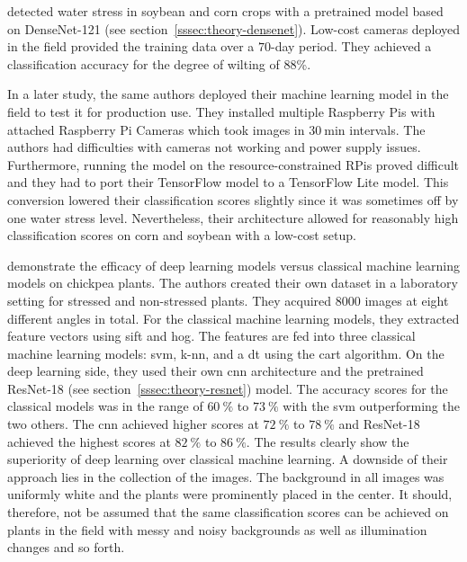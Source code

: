 \documentclass[final]{vutinfth} %
\begin{document}
\textcite{ramos-giraldo2020} detected water stress in soybean and corn
crops with a pretrained model based on DenseNet-121 (see
section~\ref{sssec:theory-densenet}). Low-cost cameras deployed in the
field provided the training data over a $70$-day period. They achieved
a classification accuracy for the degree of wilting of 88\%.

In a later study, the same authors \cite{ramos-giraldo2020a} deployed
their machine learning model in the field to test it for production
use. They installed multiple Raspberry Pis with attached Raspberry Pi
Cameras which took images in $\qty{30}{\minute}$ intervals. The
authors had difficulties with cameras not working and power supply
issues. Furthermore, running the model on the resource-constrained
RPis proved difficult and they had to port their TensorFlow model to a
TensorFlow Lite model. This conversion lowered their classification
scores slightly since it was sometimes off by one water stress
level. Nevertheless, their architecture allowed for reasonably high
classification scores on corn and soybean with a low-cost setup.

\textcite{azimi2020} demonstrate the efficacy of deep learning models
versus classical machine learning models on chickpea plants. The
authors created their own dataset in a laboratory setting for stressed
and non-stressed plants. They acquired $8000$ images at eight
different angles in total. For the classical machine learning models,
they extracted feature vectors using \gls{sift} and \gls{hog}. The
features are fed into three classical machine learning models:
\gls{svm}, \gls{k-nn}, and a \gls{dt} using the \gls{cart}
algorithm. On the deep learning side, they used their own \gls{cnn}
architecture and the pretrained ResNet-18 (see
section~\ref{sssec:theory-resnet}) model. The accuracy scores for the
classical models was in the range of $\qty{60}{\percent}$ to
$\qty{73}{\percent}$ with the \gls{svm} outperforming the two
others. The \gls{cnn} achieved higher scores at $\qty{72}{\percent}$
to $\qty{78}{\percent}$ and ResNet-18 achieved the highest scores at
$\qty{82}{\percent}$ to $\qty{86}{\percent}$. The results clearly show
the superiority of deep learning over classical machine learning. A
downside of their approach lies in the collection of the images. The
background in all images was uniformly white and the plants were
prominently placed in the center. It should, therefore, not be assumed
that the same classification scores can be achieved on plants in the
field with messy and noisy backgrounds as well as illumination changes
and so forth.
\end{document}
